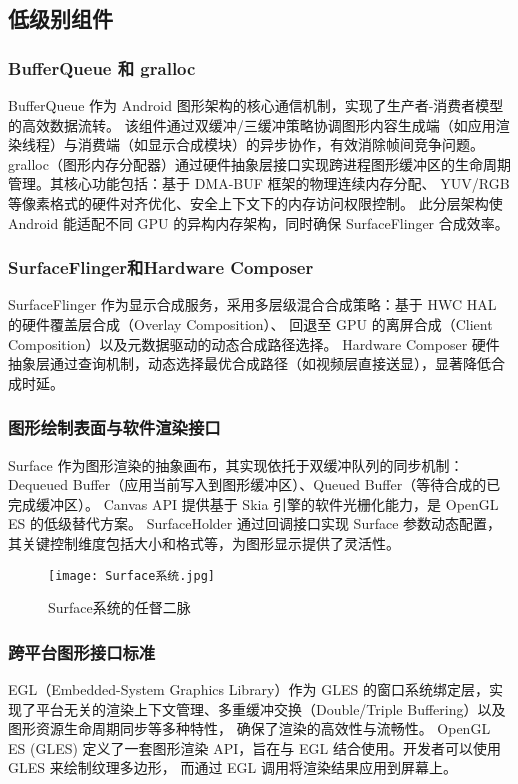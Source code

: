 \subsection{低级别组件}

\subsubsection{BufferQueue 和 gralloc}
BufferQueue 作为 Android 图形架构的核心通信机制，实现了生产者-消费者模型的高效数据流转。
该组件通过双缓冲/三缓冲策略协调图形内容生成端（如应用渲染线程）与消费端（如显示合成模块）的异步协作，有效消除帧间竞争问题。
gralloc（图形内存分配器）通过硬件抽象层接口实现跨进程图形缓冲区的生命周期管理。其核心功能包括：基于 DMA-BUF 框架的物理连续内存分配、
YUV/RGB 等像素格式的硬件对齐优化、安全上下文下的内存访问权限控制。
此分层架构使 Android 能适配不同 GPU 的异构内存架构，同时确保 SurfaceFlinger 合成效率。

\subsubsection{SurfaceFlinger和Hardware Composer}
SurfaceFlinger 作为显示合成服务，采用多层级混合合成策略：基于 HWC HAL 的硬件覆盖层合成（Overlay Composition）、
回退至 GPU 的离屏合成（Client Composition）以及元数据驱动的动态合成路径选择。
Hardware Composer 硬件抽象层通过查询机制，动态选择最优合成路径（如视频层直接送显），显著降低合成时延。

\subsubsection{图形绘制表面与软件渲染接口}
Surface 作为图形渲染的抽象画布，其实现依托于双缓冲队列的同步机制：Dequeued Buffer（应用当前写入到图形缓冲区）、Queued Buffer（等待合成的已完成缓冲区）。
Canvas API 提供基于 Skia 引擎的软件光栅化能力，是 OpenGL ES 的低级替代方案。
SurfaceHolder 通过回调接口实现 Surface 参数动态配置，其关键控制维度包括大小和格式等，为图形显示提供了灵活性。

\begin{figure}[h]
  \centering
  \texttt{[image: Surface系统.jpg]}
  \caption{Surface系统的任督二脉}    
  \label{fig:Surface系统的任督二脉}
  \cite{邓凡平2011深入理解}
\end{figure}


\subsubsection{跨平台图形接口标准}
EGL（Embedded-System Graphics Library）作为 GLES 的窗口系统绑定层，实现了平台无关的渲染上下文管理、多重缓冲交换（Double/Triple Buffering）以及图形资源生命周期同步等多种特性，
确保了渲染的高效性与流畅性。
OpenGL ES (GLES) 定义了一套图形渲染 API，旨在与 EGL 结合使用。开发者可以使用 GLES 来绘制纹理多边形，
而通过 EGL 调用将渲染结果应用到屏幕上。

